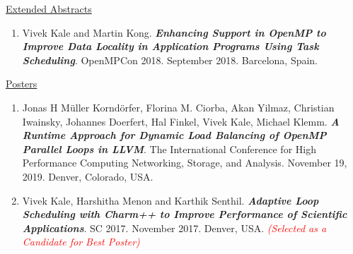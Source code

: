 \underline{Extended Abstracts}
\begin{enumerate}
\item Vivek Kale and Martin Kong. \textbf{\textit{Enhancing Support in OpenMP to Improve Data Locality in Application Programs Using Task Scheduling}}. OpenMPCon 2018. September 2018. Barcelona, Spain.
\end{enumerate}

\underline{Posters}
\begin{enumerate}
\item Jonas H Müller Korndörfer, Florina M. Ciorba, Akan Yilmaz, Christian Iwainsky, Johannes Doerfert, Hal Finkel, Vivek Kale, Michael Klemm. \textbf{\textit{A Runtime Approach for Dynamic Load Balancing of OpenMP Parallel Loops in LLVM}}. The International Conference for High Performance Computing Networking, Storage, and Analysis. November 19, 2019. Denver, Colorado, USA.
\item Vivek Kale, Harshitha Menon and Karthik Senthil. \textbf{\textit{Adaptive Loop Scheduling with Charm++ to Improve Performance of Scientific Applications}}. SC 2017. November 2017. Denver, USA. \textit{\textcolor{red}{(Selected as a Candidate for Best Poster)}}
\end{enumerate}



